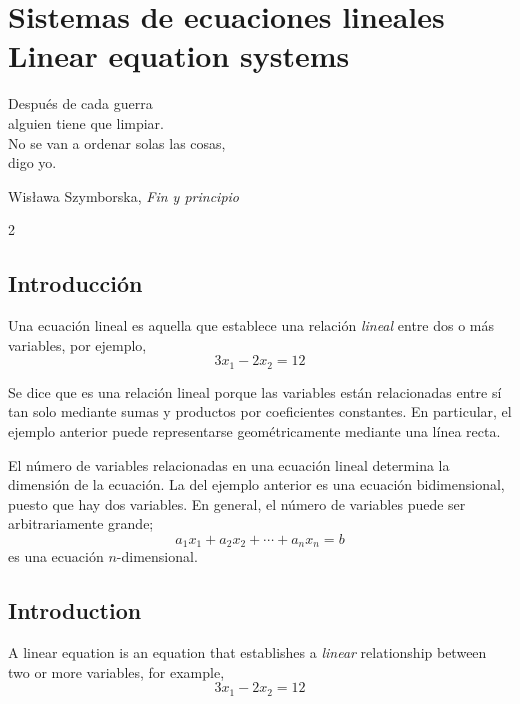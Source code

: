 \chapter{Sistemas de ecuaciones lineales\\ Linear equation systems}\label{ch:sistemas} 
\epigraph{Después de cada guerra \\ alguien tiene que limpiar. \\ No se van a ordenar solas las cosas, \\ digo yo.}{Wisława Szymborska, \emph{Fin y principio}}

\sloppy
\begin{paracol}{2}

\section{Introducción}

Una ecuación lineal es aquella que establece una relación \emph{lineal} entre dos o más variables, por ejemplo,
\begin{equation*}
3x_1-2x_2=12
\end{equation*}

Se dice que es una relación lineal porque las variables están relacionadas entre sí tan solo mediante sumas y productos por coeficientes constantes. En particular, el ejemplo anterior puede representarse geométricamente mediante una línea recta.

El número de variables relacionadas en una ecuación lineal determina la dimensión de la ecuación. La del ejemplo anterior es una ecuación bidimensional, puesto que hay dos variables. En general, el número de variables puede ser arbitrariamente grande;
\begin{equation*}
a_1x_1+a_2x_2+\cdots +a_nx_n=b
\end{equation*}
es una ecuación $n$-dimensional.

\switchcolumn

\section{Introduction}

A linear equation is an equation that establishes a \emph{linear} relationship between two or more variables, for example,
\begin{equation*}
3x_1-2x_2=12
\end{equation*}


\end{paracol}
